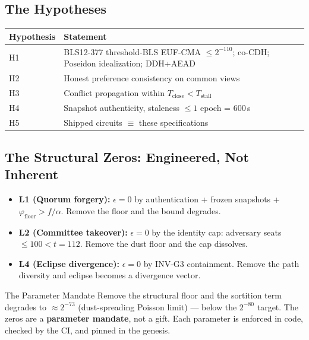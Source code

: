 \documentclass[11pt, a4paper]{article}
\theoremstyle{plain}
\theoremstyle{definition}
\theoremstyle{remark}
\begin{document}
\subsection{The Hypotheses}

\begin{table}[h]
\centering
{}
\begin{tabular}{l|p{11cm}}
\rowcolor{hsmaBlue!20} \textbf{Hypothesis} & \textbf{Statement} \\
\hline
H1 & BLS12-377 threshold-BLS EUF-CMA $\le 2^{-110}$; co-CDH; Poseidon idealization; DDH+AEAD \\
H2 & Honest preference consistency on common views \\
H3 & Conflict propagation within $T_{\text{close}} < T_{\text{stall}}$ \\
H4 & Snapshot authenticity, staleness $\le 1$ epoch = 600\,s \\
H5 & Shipped circuits $\equiv$ these specifications \\
\bottomrule
\end{tabular}
\end{table}

\subsection{The Structural Zeros: Engineered, Not Inherent}

\begin{itemize}
\item \textbf{L1 (Quorum forgery):} $\epsilon = 0$ by authentication +
frozen snapshots + $\varphi_{\text{floor}} > f/\alpha$. Remove the
floor and the bound degrades.
\item \textbf{L2 (Committee takeover):} $\epsilon = 0$ by the identity
cap: adversary seats $\le 100 < t = 112$. Remove the dust floor and
the cap dissolves.
\item \textbf{L4 (Eclipse divergence):} $\epsilon = 0$ by INV-G3
containment. Remove the path diversity and eclipse becomes a
divergence vector.
\end{itemize}

\begin{warnbox}{The Parameter Mandate}
Remove the structural floor and the sortition term degrades to
 $\approx 2^{-73}$ (dust-spreading Poisson limit) --- below the
 $2^{-80}$ target. The zeros are a \textbf{parameter mandate}, not a
gift. Each parameter is enforced in code, checked by the CI, and
pinned in the genesis.
\end{warnbox}
\end{document}
